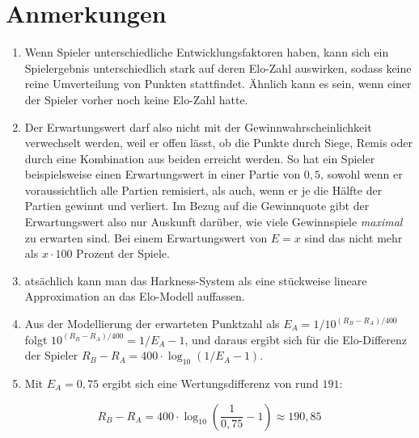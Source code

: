\chapter{Anmerkungen}

\begin{enumerate}
    \item\label{anm_1} Wenn Spieler unterschiedliche Entwicklungsfaktoren haben, kann sich ein Spielergebnis unterschiedlich stark auf deren Elo-Zahl auswirken, sodass keine reine Umverteilung von Punkten stattfindet. Ähnlich kann es sein, wenn einer der Spieler vorher noch keine Elo-Zahl hatte.
    \item\label{anm_2} Der Erwartungswert darf also nicht mit der Gewinnwahrscheinlichkeit verwechselt werden, weil er offen lässt, ob die Punkte durch Siege, Remis oder durch eine Kombination aus beiden erreicht werden. So hat ein Spieler beispielsweise einen Erwartungswert in einer Partie von $0,5$, sowohl wenn er voraussichtlich alle Partien remisiert, als auch, wenn er je die Hälfte der Partien gewinnt und verliert. Im Bezug auf die Gewinnquote gibt der Erwartungswert also nur Auskunft darüber, wie viele Gewinnspiele \textit{maximal} zu erwarten sind. Bei einem Erwartungswert von $E = x$ sind das nicht mehr als $x \cdot 100$ Prozent der Spiele.
    \item\label{anm_3} atsächlich kann man das Harkness-System als eine stückweise lineare Approximation an das Elo-Modell auffassen.
    \item\label{anm_4} Aus der Modellierung der erwarteten Punktzahl als $E_{A} = 1 / 10^{(R_{B} - R_{A}) / 400}$ folgt $10^{(R_{B} - R_{A}) / 400} = 1 / E_{A} - 1$, und daraus ergibt sich für die Elo-Differenz der Spieler $R_{B} - R_{A} = 400 \cdot \log_{10} (1 / E_{A} - 1)$.
    \item\label{anm_5} Mit $E_{A} = 0,75$ ergibt sich eine Wertungsdifferenz von rund $191$:
\end{enumerate}
\[
    R_{B} - R_{A} = 400 \cdot \log_{10} (\frac{1}{0,75} - 1) \approx 190,85
\]